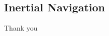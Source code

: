 \documentclass[14pt,hyperref={CJKbookmarks=true}]{beamer}
\theoremstyle{plain}
\theoremstyle{definition}
\theoremstyle{remark}
\begin{document}
\subsection{Inertial Navigation}





\begin{frame}
\Huge
\begin{center}
Thank you
\end{center}
\end{frame}
\end{document}
